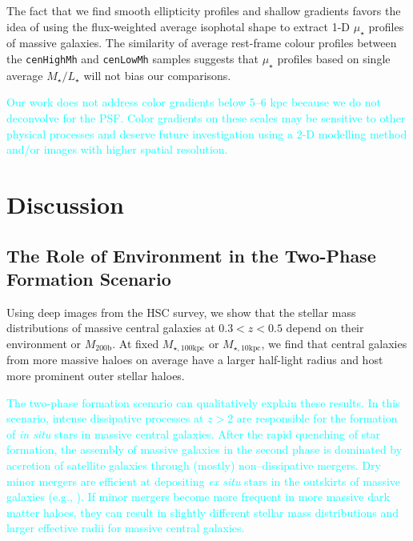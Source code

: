 \documentclass[a4paper,fleqn,usenatbib]{mnras}
\def\rbcg{\texttt{cenHighMh}}
\def\nbcg{\texttt{cenLowMh}}
\def\mhalo{{$M_{\mathrm{200b}}$}}
\def\minn{{$M_{\star,10\mathrm{kpc}}$}}
\def\mtot{{$M_{\star,100\mathrm{kpc}}$}}
\def\m2l{{$M_{\star}/L_{\star}$}}
\def\mden{{$\mu_{\star}$}}
\newcommand{\song}[1]{\textcolor{cyan}{#1}}
\begin{document}
    The fact that we find smooth ellipticity profiles and shallow gradients favors 
    the idea of using the flux-weighted average isophotal shape to extract 1-D \mden{} 
    profiles of massive galaxies. 
    The similarity of average rest-frame colour profiles between the \rbcg{} and \nbcg{}
    samples suggests that \mden{} profiles based on single average \m2l{} will not bias 
    our comparisons. 
    
    \song{
    Our work does not address color gradients below 5--6 kpc because we do not deconvolve 
    for the PSF. 
    Color gradients on these scales may be sensitive to other physical processes and 
    deserve future investigation using a 2-D modelling method and/or images with higher 
    spatial resolution.
    }
    
   

\section{Discussion}
    \label{sec:discussion}

\subsection{The Role of Environment in the Two-Phase Formation Scenario}
            
    Using deep images from the HSC survey, we show that the stellar mass distributions 
    of massive central galaxies at $0.3 < z < 0.5$ depend on their environment or 
    \mhalo{}. 
    At fixed \mtot{} or \minn{}, we find that central galaxies from more massive 
    haloes on average have a larger half-light radius and host more prominent outer 
    stellar haloes. 
    
    \song{
    The two-phase formation scenario can qualitatively explain these results. 
    In this scenario, intense dissipative processes at $z > 2$ are responsible for the 
    formation of \textit{in situ} stars in massive central galaxies. 
    After the rapid quenching of star formation, the assembly of massive galaxies in 
    the second phase is dominated by accretion of satellite galaxies through (mostly) 
    non--dissipative mergers. 
    Dry minor mergers are efficient at depositing \textit{ex situ} stars in the 
    outskirts of massive galaxies (e.g., \citealt{Oogi2013, Bedorf2013}). 
    If minor mergers become more frequent in more massive dark matter haloes, 
    they can result in slightly different stellar mass distributions and larger 
    effective radii for massive central galaxies.
    }
      
\end{document}
